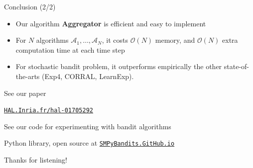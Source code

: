 \documentclass[12pt,english,ignorenonframetext,]{beamer}
\newcommand{\Fontify}{}
\providecommand{\tightlist}{%
  \setlength{\itemsep}{0pt}\setlength{\parskip}{0pt}}
\begin{document}
\begin{frame}[fragile]{%
\protect\hypertarget{conclusion-22}{%
Conclusion (2/2)}}

\begin{itemize}
\tightlist
\item
  Our algorithm \textbf{Aggregator} is efficient and easy to implement
\item
  For \(N\) algorithms \(\mathcal{A}_1,\ldots,\mathcal{A}_N\), it costs
  \(\mathcal{O}(N)\) memory, and \(\mathcal{O}(N)\) extra computation
  time at each time step
\item
  For stochastic bandit problem, it outperforms empirically the other
  state-of-the-arts (Exp4, CORRAL, LearnExp).
\end{itemize}

\begin{block}{See our paper}

\href{https://hal.inria.fr/hal-01705292}{\texttt{HAL.Inria.fr/hal-01705292}}

\end{block}

\begin{block}{See our code for experimenting with bandit algorithms}

Python library, open source at
\href{https://SMPyBandits.GitHub.io}{\texttt{SMPyBandits.GitHub.io}}

\end{block}

\begin{center}\begin{LARGE}
  {\Fontify Thanks for listening!}
\end{LARGE}\end{center}

\end{frame}
\end{document}
